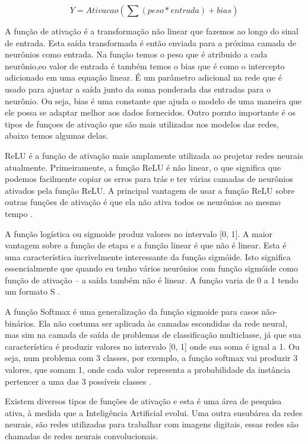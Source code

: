 \documentclass[openright]{UFRGS} %
\begin{document}
\[ Y = Ativacao(\sum (peso * entrada) + bias) \]

A função de ativação é a transformação não linear que fazemos ao longo do sinal de entrada. Esta saída transformada é então enviada para a próxima camada de neurônios como entrada. Na função temos o peso que é atribuido a cada neurônio,eo valor de entrada é também temos o bias que é como o intercepto adicionado em uma equação linear. É um parâmetro adicional na rede que é usado para ajustar a saída junto da soma ponderada das entradas para o neurônio. Ou seja, bias é uma constante que ajuda o modelo de uma maneira que ele possa se adaptar melhor aos dados fornecidos. Outro pornto importante é os tipos de funçoes de ativação que são mais utilizadas nos modelos das redes, abaixo temos algumas delas.


ReLU é a função de ativação mais amplamente utilizada ao projetar redes neurais atualmente. Primeiramente, a função ReLU é não linear, o que significa que podemos facilmente copiar os erros para trás e ter várias camadas de neurônios ativados pela função ReLU. A principal vantagem de usar a função ReLU sobre outras funções de ativação é que ela não ativa todos os neurônios ao mesmo tempo \cite{gomide2012redes}.



A função logística ou sigmoide produz valores no intervalo [0, 1].
 A maior vantagem sobre a função de etapa e a função linear é que não é linear. Esta é uma característica incrivelmente interessante da função sigmóide. Isto significa essencialmente que quando eu tenho vários neurônios com função sigmóide como função de ativação – a saída também não é linear. A função varia de 0 a 1 tendo um formato S  \cite{gomide2012redes}.


A função Softmax é uma generalização da função sigmoide para casos não-binários. Ela não costuma ser aplicada às camadas escondidas da rede neural, mas sim na camada de saída de problemas de classificação multiclasse, já que sua característica é produzir valores no intervalo [0, 1] onde sua soma é igual a 1. Ou seja, num problema com 3 classes, por exemplo, a função softmax vai produzir 3 valores, que somam 1, onde cada valor representa a probabilidade da instância pertencer a uma das 3 possíveis classes \cite{gomide2012redes}.

Existem diversos tipos de funções de ativação e esta é uma área de pesquisa ativa, à medida que a Inteligência Artificial evolui. Uma outra susubárea da redes neurais, são redes  utilizadas para trabalhar com imagens digitais, essas redes são chamadas de redes neurais convolucionais.
\end{document}
